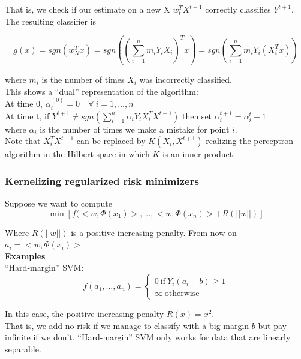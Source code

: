 \documentclass[11pt, english]{article}
\begin{document}
That is, we check if our estimate on a new X $w^T_t X^{t+1}$ correctly classifies $Y^{t+1}$. The resulting classifier is

\begin{equation}
g(x) = sgn(w_N^T x) = sgn((\sum_{i=1}^{n} m_i Y_i X_i)^T x) = sgn(\sum_{i=1}^{n}m_i Y_i(X_i^Tx))
\end{equation}

where $m_i$ is the number of times $X_i$ was incorrectly classified.\\

This shows a ``dual'' representation of the algorithm:\\

At time 0, $\alpha_i^{(0)} = 0 \quad \forall \ i = 1, \dots, n$\\
At time t, if $Y^{t+1} \neq sgn(\sum_{i=1}^{n} \alpha_i Y_i X_i^TX^{t+1}) $ then set $\alpha_i^{t+1} = \alpha_i^t + 1$\\

where $\alpha_i$ is the number of times we make a mistake for point $i$.\\ 

Note that $X_i^TX^{t+1}$ can be replaced by $K(X_i, X^{t+1})$ realizing the perceptron algorithm in the Hilbert space in which $K$ is an inner product.


\subsubsection{Kernelizing regularized risk minimizers}%

Suppose we want to compute
\begin{equation}
	\min[f(<w,\Phi(x_1)>, \dots, <w, \Phi (x_n)>+ R(||w||)]
\end{equation}

Where $ R(||w||)$ is a positive increasing penalty. From now on $a_i = <w,\Phi(x_i)>$\\

\textbf{Examples} \\
``Hard-margin'' SVM:
$$f(a_1, \dots, a_n) = \begin{cases}
0\ \text{if}\ Y_i(a_i + b)\geq 1\\
\infty \ \text{otherwise}
\end{cases}$$

In this case, the positive increasing penalty $R(x) = x^2$.\\

That is, we add no risk if we manage to classify with a big margin $b$ but pay infinite if we don't. ``Hard-margin'' SVM only works for data that are linearly separable.\\
\end{document}

